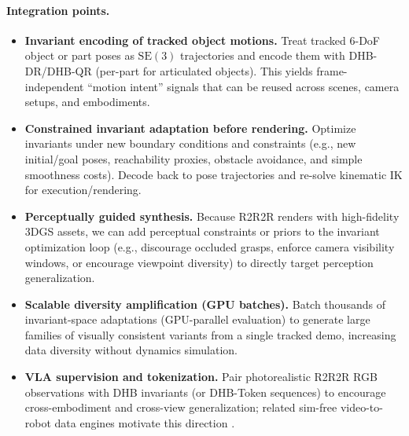 \documentclass[11pt]{article}
\begin{document}
\paragraph{Integration points.}
\begin{itemize}
  \item \textbf{Invariant encoding of tracked object motions.} Treat tracked 6-DoF object or part poses as $\mathrm{SE}(3)$ trajectories and encode them with DHB-DR/DHB-QR (per-part for articulated objects). This yields frame-independent ``motion intent'' signals that can be reused across scenes, camera setups, and embodiments.

  \item \textbf{Constrained invariant adaptation before rendering.} Optimize invariants under new boundary conditions and constraints (e.g., new initial/goal poses, reachability proxies, obstacle avoidance, and simple smoothness costs). Decode back to pose trajectories and re-solve kinematic IK for execution/rendering.

  \item \textbf{Perceptually guided synthesis.} Because R2R2R renders with high-fidelity 3DGS assets, we can add perceptual constraints or priors to the invariant optimization loop (e.g., discourage occluded grasps, enforce camera visibility windows, or encourage viewpoint diversity) to directly target perception generalization.

  \item \textbf{Scalable diversity amplification (GPU batches).} Batch thousands of invariant-space adaptations (GPU-parallel evaluation) to generate large families of visually consistent variants from a single tracked demo, increasing data diversity without dynamics simulation.

  \item \textbf{VLA supervision and tokenization.} Pair photorealistic R2R2R RGB observations with DHB invariants (or DHB-Token sequences) to encourage cross-embodiment and cross-view generalization; related sim-free video-to-robot data engines motivate this direction \cite{lepert2025phantom,xue2025demogen}.
\end{itemize}
\end{document}

